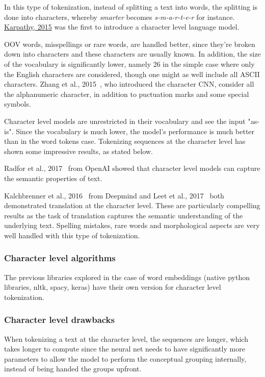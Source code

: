 In this type of tokenization, instead of splitting a text into words, the splitting is done into characters, whereby \emph{smarter} becomes \emph{s-m-a-r-t-e-r} for instance. \href{https://github.com/karpathy/char-rnn}{Karpathy, 2015} was the first to introduce a character level language model.

OOV words, misspellings or rare words, are handled better, since they're broken down into characters and these characters are usually known. In addition, the size of the vocabulary is significantly lower, namely 26 in the simple case where only the English characters are considered, though one might as well include all ASCII characters. Zhang et al., 2015~\cite{zhang2015text}, who introduced the character CNN, consider all the alphanumeric character, in addition to puctuation marks and some special symbols.

Character level models are unrestricted in their vocabulary and see the input "as-is". Since the vocabulary is much lower, the model's performance is much better than in the word tokens case. Tokenizing sequences at the character level has shown some impressive results, as stated below.

Radfor et al., 2017~\cite{radford2017learning} from OpenAI showed that character level models can capture the semantic properties of text.

Kalchbrenner et al., 2016~\cite{kalchbrenner2016neural} from Deepmind and Leet et al., 2017~\cite{lee-etal-2017-fully} both demonstrated translation at the character level. These are particularly compelling results as the task of translation captures the semantic understanding of the underlying text. Spelling mistakes, rare words and morphological aspects are very well handled with this type of tokenization.

\subsubsection{Character level algorithms}

The previous libraries explored in the case of word embeddings (native python libraries, nltk, spacy, keras) have their own version for character level tokenization.

\subsubsection{Character level drawbacks}

When tokenizing a text at the character level, the sequences are longer, which takes longer to compute since the neural net needs to have significantly more parameters to allow the model to perform the conceptual grouping internally, instead of being handed the groups upfront.

